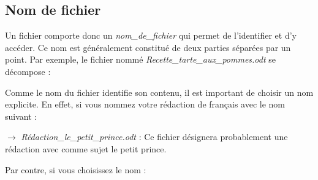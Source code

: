 \documentclass[11pt, a4paper]{book}
\begin{document}
\subsection{Nom de fichier}
Un fichier comporte donc un {\it nom\_de\_fichier}  qui permet de l’identifier et d’y accéder. Ce nom est généralement constitué de deux parties séparées par un point. Par exemple, le fichier nommé {\it Recette\_tarte\_aux\_pommes.odt} se décompose :

\begin{center}
\end{center}

Comme le nom du fichier identifie son contenu, il est important de choisir un nom explicite. En effet, si vous nommez votre rédaction de français avec le nom suivant :

$\rightarrow$ {\it Rédaction\_le\_petit\_prince.odt} : Ce fichier désignera probablement une rédaction avec comme sujet le petit prince.

Par contre, si vous choisissez le nom :
\end{document}
